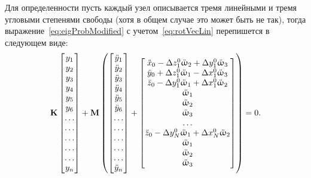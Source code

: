 Для определенности пусть каждый узел описывается тремя линейными и тремя угловыми степенями свободы (хотя в общем случае это может быть не так), тогда выражение~\eqref{eq:eigProbModified} с учетом~\eqref{eq:rotVecLin} перепишется в следующем виде:
\begin{equation}
	\mathbf{K}
	\begin{bmatrix}
	y_1 \\ y_2 \\ y_3 \\ y_4 \\ y_5 \\ y_6 \\
	\hdots \\ \hdots \\ \hdots \\ \hdots \\ \hdots \\
	y_n
	\end{bmatrix}
	 + \mathbf{M} \left(
	\begin{bmatrix}
	\ddot{y}_1 \\ \ddot{y}_2 \\ \ddot{y}_3 \\ \ddot{y}_4 \\ \ddot{y}_5 \\ \ddot{y}_6 \\
	\hdots \\ \hdots \\ \hdots \\ \hdots \\ \hdots \\
	\ddot{y}_n
	\end{bmatrix}
	 +
	 \begin{bmatrix}
		\ddot{x}_0 - \Delta z_1^0 \ddot{\upomega}_2 + \Delta y_1^0 \ddot{\upomega}_3 \\
		\ddot{y}_0 + \Delta z_1^0 \ddot{\upomega}_1 - \Delta x_1^0 \ddot{\upomega}_3 \\
		\ddot{z}_0 -\Delta y_1^0 \ddot{\upomega}_1 + \Delta x_1^0 \ddot{\upomega}_2 \\
		\ddot{\upomega}_1 \\
		\ddot{\upomega}_2	\\
		\ddot{\upomega}_3 \\
		\hdots \\
		\ddot{z}_0 -\Delta y_N^0 \ddot{\upomega}_1 + \Delta x_N^0 \ddot{\upomega}_2 \\
		\ddot{\upomega}_1 \\
		\ddot{\upomega}_2	\\
		\ddot{\upomega}_3 \\
	 \end{bmatrix}
	 \right) = 0.
	 \label{eq:motionModified}
\end{equation}

